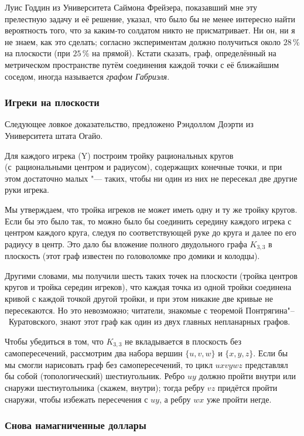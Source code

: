 \documentclass[twoside]{book}
\begin{document}
Луис Годдин из Университета Саймона Фрейзера, показавший мне эту прелестную задачу и её решение, указал, что было бы не менее интересно найти вероятность того, что за каким-то солдатом никто не присматривает.
Ни он, ни я не знаем, как это сделать;
согласно экспериментам должно получиться около $28\,\%$ на плоскости (при $25\,\%$ на прямой).
Кстати сказать, граф, определённый на метрическом пространстве путём соединения каждой точки с её ближайшим соседом, иногда называется \emph{графом Габриэля}.

\subsubsection*{Игреки на плоскости}

Следующее ловкое  доказательство, предложено Рэндоллом Доэрти из Университета штата Огайо.

\medskip

Для каждого игрека (Y) построим тройку рациональных кругов (с~рациональными центром и радиусом), содержащих конечные точки, и при этом достаточно малых "--- таких, чтобы ни один из них не пересекал две другие руки игрека.

Мы утверждаем, что тройка игреков не может иметь одну и ту же тройку кругов.
Если бы это было так, то можно было бы соединить середину каждого игрека с центром каждого круга, следуя по соответствующей руке до круга и далее по его радиусу в центр.
Это дало бы вложение полного двудольного графа $K_{3,3}$ в плоскость (этот граф известен по головоломке про домики и колодцы).

Другими словами, мы получили шесть таких точек на плоскости (тройка центров кругов и тройка середин игреков), что каждая точка из одной тройки соединена кривой с каждой точкой другой тройки, и при этом никакие две кривые не пересекаются.
Но это невозможно; читатели, знакомые с теоремой Понтрягина"--~Куратовского, знают этот граф как один из двух главных непланарных графов.

Чтобы убедиться в том, что $K_{3,3}$ не вкладывается в плоскость без самопересечений, рассмотрим два набора вершин $\{u, v, w\}$ и $\{x, y, z\}$.
Если бы мы смогли нарисовать граф без самопересечений, то цикл $uxvywz$ представлял бы  собой (топологический) шестиугольник.
Ребро $uy$ должно пройти внутри или снаружи шестиугольника (скажем, внутри);
тогда ребру $vz$ придётся пройти снаружи, чтобы избежать пересечения с $uy$, а ребру $wx$ уже пройти негде.
\heart

\subsubsection*{Снова  намагниченные доллары}
\end{document}
